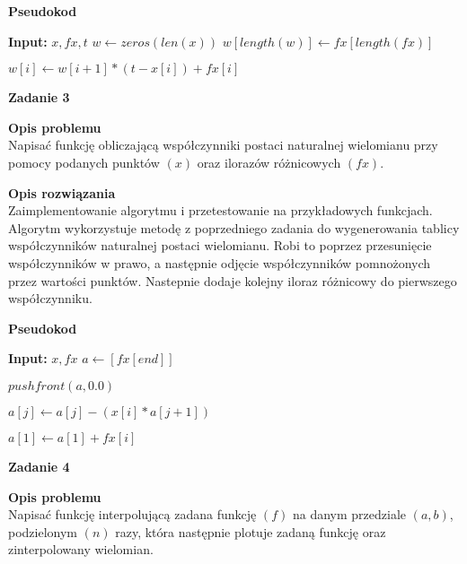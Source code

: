 \documentclass{article}
\begin{document}
\noindent \textbf{Pseudokod}
\begin{algorithmic}
	\State \textbf{Input:} $x, fx, t$
	\State $w \gets zeros(len(x))$
	\State $w[length(w)] \gets fx[length(fx)]$

	\State $w[i] \gets w[i+1] * (t - x[i]) + fx[i]$
	\EndFor

	\State {}

\end{algorithmic}

\pagebreak

\noindent \textbf{\large Zadanie 3}

\noindent \textbf{Opis problemu} \\
Napisać funkcję obliczającą współczynniki postaci naturalnej wielomianu
przy pomocy podanych punktów $(x)$ oraz ilorazów różnicowych $(fx)$.

\noindent \textbf{Opis rozwiązania} \\
Zaimplementowanie algorytmu i przetestowanie na przykładowych funkcjach.
Algorytm wykorzystuje metodę z poprzedniego zadania do wygenerowania tablicy
współczynników naturalnej postaci wielomianu. Robi to poprzez przesunięcie
współczynników w prawo, a następnie odjęcie współczynników pomnożonych przez
wartości punktów. Nastepnie dodaje kolejny iloraz różnicowy do pierwszego
współczynniku.

\noindent \textbf{Pseudokod}
\begin{algorithmic}
	\State \textbf{Input:} $x, fx$
	\State $a \gets [fx[end]]$


	\State $pushfront(a, 0.0)$


	\State $a[j] \gets a[j] - (x[i] * a[j+1])$

	\EndFor
	\State $a[1] \gets a[1] + fx[i]$

	\EndFor

	\State {}
\end{algorithmic}

\noindent \textbf{\large Zadanie 4}

\noindent \textbf{Opis problemu} \\
Napisać funkcję interpolującą zadana funkcję $(f)$ na danym przedziale $(a, b)$,
podzielonym $(n)$ razy, która następnie plotuje zadaną funkcję oraz zinterpolowany wielomian.
\end{document}
